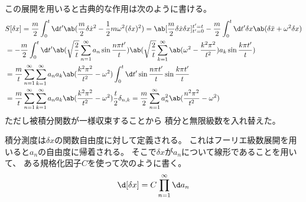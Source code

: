 この展開を用いると古典的な作用は次のように書ける。
\begin{equation}
  \begin{split}
    &S[\delta x]
    =\frac{m}{2}\int_0^t\d t'
    \ab(\frac{m}{2}\delta\dot{x}^2-\frac{1}{2}m\omega^2(\delta x)^2)
    =\ab[\frac{m}{2}\delta\dot{x}\delta x]_{t'=0}^{t'=t}
    -\frac{m}{2}\int_0^t\d t'
    \delta x\ab(\delta\ddot{x}+\omega^2\delta x) \\
    &=-\frac{m}{2}\int_0^t\d t'
    \ab(\sqrt{\frac{2}{t}}\sum_{n=1}^\infty
    a_n \sin\frac{n\pi t'}{t})
    \ab(\sqrt{\frac{2}{t}}\sum_{k=1}^\infty
    \ab(\omega^2-\frac{k^2\pi^2}{t^2})
    a_k \sin\frac{k\pi t'}{t}) \\
    &=\frac{m}{t}\sum_{n=1}^\infty\sum_{k=1}^\infty
    a_n a_k
    \ab(\frac{k^2\pi^2}{t^2}-\omega^2)
    \int_0^t\d t'
    \sin\frac{n\pi t'}{t}
    \sin\frac{k\pi t'}{t} \\
    &=\frac{m}{t}\sum_{n=1}^\infty\sum_{k=1}^\infty
    a_n a_k
    \ab(\frac{k^2\pi^2}{t^2}-\omega^2)
    \frac{t}{2}\delta_{n,k}
    =\frac{m}{2}\sum_{n=1}^\infty
    a_n^2
    \ab(\frac{n^2\pi^2}{t^2}-\omega^2)
  \end{split}
\end{equation}
ただし被積分関数が一様収束することから
積分と無限級数を入れ替えた。

積分測度は$\delta x$の関数自由度に対して定義される。
これはフーリエ級数展開を用いると$a_n$の自由度に帰着される。
そこで$\delta x$が$a_n$について線形であることを用いて、
ある規格化因子$C$を使って次のように書く。
\begin{equation}
  \d[\delta x]
  =C\prod_{n=1}^\infty\d a_n
\end{equation}


